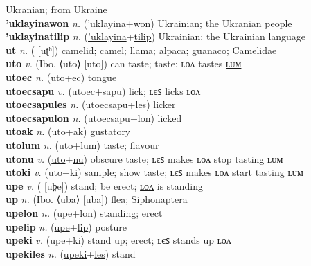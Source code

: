 Ukranian; from Ukraine \label{'uklayinaak} \\
\textbf{'uklayinawon} \textit{n.} (\hyperref['uklayina]{'uklayina}+\hyperref[won]{won})
Ukrainian; the Ukranian people \label{'uklayinawon} \\
\textbf{'uklayinatilip} \textit{n.} (\hyperref['uklayina]{'uklayina}+\hyperref[tilip]{tilip})
Ukrainian; the Ukrainian language \label{'uklayinatilip} \\
\textbf{ut} \textit{n.} ( [uʈʰ])
camelid; camel; llama; alpaca; guanaco; Camelidae \label{ut} \\
\textbf{uto} \textit{v.} (Ibo. ⟨uto⟩ [uto])
can taste; taste; ʟᴏᴧ tastes \hyperref[utolum]{ʟᴜᴍ} \label{uto} \\
\textbf{utoec} \textit{n.} (\hyperref[uto]{uto}+\hyperref[ec]{ec})
tongue \label{utoec} \\
\textbf{utoecsapu} \textit{v.} (\hyperref[utoec]{utoec}+\hyperref[sapu]{sapu})
lick; \hyperref[utoecsapules]{ʟєꜱ} licks \hyperref[utoecsapulon]{ʟᴏᴧ} \label{utoecsapu} \\
\textbf{utoecsapules} \textit{n.} (\hyperref[utoecsapu]{utoecsapu}+\hyperref[les]{les})
licker \label{utoecsapules} \\
\textbf{utoecsapulon} \textit{n.} (\hyperref[utoecsapu]{utoecsapu}+\hyperref[lon]{lon})
licked \label{utoecsapulon} \\
\textbf{utoak} \textit{n.} (\hyperref[uto]{uto}+\hyperref[ak]{ak})
gustatory \label{utoak} \\
\textbf{utolum} \textit{n.} (\hyperref[uto]{uto}+\hyperref[lum]{lum})
taste; flavour \label{utolum} \\
\textbf{utonu} \textit{v.} (\hyperref[uto]{uto}+\hyperref[nu]{nu})
obscure taste; ʟєꜱ makes ʟᴏᴧ stop tasting ʟᴜᴍ \label{utonu} \\
\textbf{utoki} \textit{v.} (\hyperref[uto]{uto}+\hyperref[ki]{ki})
sample; show taste; ʟєꜱ makes ʟᴏᴧ start tasting ʟᴜᴍ \label{utoki} \\
\textbf{upe} \textit{v.} ( [ub̤e])
stand; be erect; \hyperref[upelon]{ʟᴏᴧ} is standing \label{upe} \\
\textbf{up} \textit{n.} (Ibo. ⟨uba⟩ [uba])
flea; Siphonaptera \label{up} \\
\textbf{upelon} \textit{n.} (\hyperref[upe]{upe}+\hyperref[lon]{lon})
standing; erect \label{upelon} \\
\textbf{upelip} \textit{n.} (\hyperref[upe]{upe}+\hyperref[lip]{lip})
posture \label{upelip} \\
\textbf{upeki} \textit{v.} (\hyperref[upe]{upe}+\hyperref[ki]{ki})
stand up; erect; \hyperref[upekiles]{ʟєꜱ} stands up ʟᴏᴧ \label{upeki} \\
\textbf{upekiles} \textit{n.} (\hyperref[upeki]{upeki}+\hyperref[les]{les})
stand \label{upekiles} 

